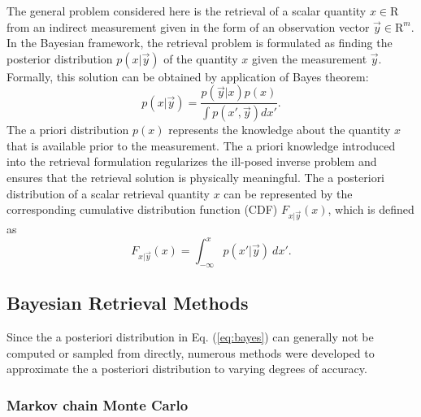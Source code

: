 \documentclass[journal abbreviation, manuscript]{copernicus}
\begin{document}
The general problem considered here is the retrieval of a scalar quantity $x \in
\mathrm{R}$ from an indirect measurement given in the form of an observation
vector $\vec{y} \in \mathrm{R}^m$. In the Bayesian framework, the retrieval
problem is formulated as finding the posterior distribution $p(x | \vec{y})$ of
the quantity $x$ given the measurement $\vec{y}$. Formally, this solution can be
obtained by application of Bayes theorem:
\begin{equation}\label{eq:bayes}
  p(x | \vec{y}) = \frac{p(\vec{y} | x)p(x)}{\int p(x', \vec{y}) dx'}.
\end{equation}
The a priori distribution $p(x)$ represents the knowledge about the quantity $x$
that is available prior to the measurement. The a priori knowledge introduced
into the retrieval formulation regularizes the ill-posed inverse problem and
ensures that the retrieval solution is physically meaningful. The a posteriori
distribution of a scalar retrieval quantity $x$ can be represented by the
corresponding cumulative distribution function (CDF) $F_{x | \vec{y}}(x)$,
which is defined as 
\begin{equation}\label{eq:cdf}
F_{x | \vec{y}}(x) = \int_{-\infty}^{x} p(x' | \vec{y}) \: dx'.
\end{equation}

\subsection{Bayesian Retrieval Methods}

Since the a posteriori distribution in Eq. (\ref{eq:bayes}) can generally not
be computed or sampled from directly, numerous methods were developed to approximate
 the a posteriori distribution to varying degrees of accuracy. 

\subsubsection{Markov chain Monte Carlo}
\end{document}
